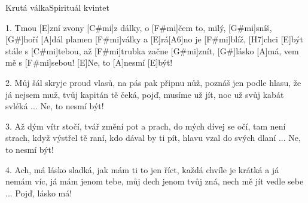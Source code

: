 \begin{song}{Krutá válka}{Spirituál kvintet}

\begin{xverse}{1. }
Tmou [E]zní zvony [C#mi]z dálky, o [F#mi]{}čem to, milý, [G#mi]sníš,
[G#]hoří [A]dál plamen [F#mi]války a [E]rá[A6]no je [F#mi]blíž,
[H7]chci [E]být stále s [C#mi]tebou, až [F#mi]trubka začne [G#mi]znít,
[G#]lásko [A]má, vem mě s [F#mi]sebou! [E]Ne, to [A]nesmí [E]být!
\end{xverse}

\begin{xverse}{2. }
Můj šál skryje proud vlasů, na pás pak připnu nůž,
poznáš jen podle hlasu, že já nejsem muž,
tvůj kapitán tě čeká, pojď, musíme už jít,
noc už svůj kabát svléká ... Ne, to nesmí být!
\end{xverse}

\begin{xverse}{3. }
Až dým vítr stočí, tvář změní pot a prach,
do mých dívej se očí, tam není strach,
když výstřel tě raní, kdo dával by ti pít,
hlavu vzal do svých dlaní ... Ne, to nesmí být!
\end{xverse}

\begin{xverse}{4. }
Ach, má lásko sladká, jak mám ti to jen říct,
každá chvíle je krátká a já nemám víc,
já mám jenom tebe, můj dech jenom tvůj zná,
nech mě jít vedle sebe ... Pojď, lásko má!
\end{xverse}

\end{song}
\chords{\chordASix}

